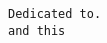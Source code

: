 \documentclass[a5paper,11pt]{book}
\begin{document}


\setcounter{page}{1}
\tt Dedicated to.
\\ and this

\frontmatter


\mainmatter


\backmatter
\end{document}
